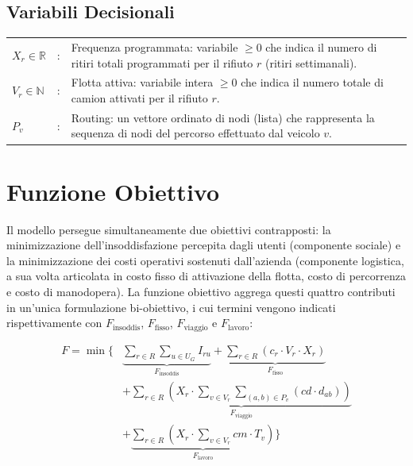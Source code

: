 \subsection{Variabili Decisionali}

\begin{longtable}[l]{@{}ll>{\raggedright\arraybackslash}p{10.5cm}}
$X_r \in \mathbb{R}$ & : & Frequenza programmata: variabile $\ge 0$ che indica il numero di ritiri totali programmati per il rifiuto $r$ (ritiri settimanali). \\
$V_r \in \mathbb{N}$ & : & Flotta attiva: variabile intera $\ge 0$ che indica il numero totale di camion attivati per il rifiuto $r$. \\
$P_v$ & : & Routing: un vettore ordinato di nodi (lista) che rappresenta la sequenza di nodi del percorso effettuato dal veicolo $v$. \\
\end{longtable}


\section{Funzione Obiettivo}

Il modello persegue simultaneamente due obiettivi contrapposti: la minimizzazione dell'insoddisfazione percepita dagli utenti (componente sociale) e la minimizzazione dei costi operativi sostenuti dall'azienda (componente logistica, a sua volta articolata in costo fisso di attivazione della flotta, costo di percorrenza e costo di manodopera). La funzione obiettivo aggrega questi quattro contributi in un'unica formulazione bi-obiettivo, i cui termini vengono indicati rispettivamente con $F_{\text{insoddis}}$, $F_{\text{fisso}}$, $F_{\text{viaggio}}$ e $F_{\text{lavoro}}$:

\begin{equation}
\begin{split}
F = \min \Biggl\{ & \underbrace{\sum_{r \in R} \sum_{u \in U_G} I_{ru}}_{F_{\text{insoddis}}} + \underbrace{\sum_{r \in R} (c_r \cdot V_{r} \cdot X_{r})}_{F_{\text{fisso}}} \\
& + \underbrace{\sum_{r \in R} \left( X_{r} \cdot \sum_{v \in V_{r}} \sum_{(a,b) \in P_{v}} (cd \cdot d_{ab}) \right)}_{F_{\text{viaggio}}} \\
& + \underbrace{\sum_{r \in R} \left( X_{r} \cdot \sum_{v \in V_{r}} cm \cdot T_{v} \right)}_{F_{\text{lavoro}}} \Biggr\}
\end{split}
\label{eq:obiettivo-completo}
\end{equation}

